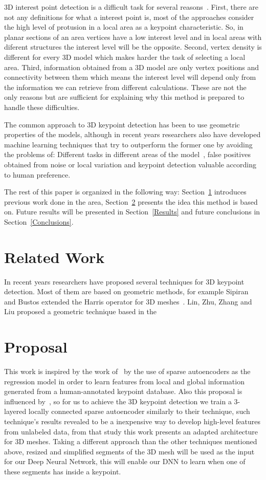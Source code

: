\documentclass{comjnl}
\begin{document}
3D interest point detection is a difficult task for several reasons~\cite{Discrim, harris3D}. 
First, there are not any definitions for what a interest point is, 
most of the approaches consider the high level of protusion in a local
area as a keypoint characteristic. So, in planar sections of an area
vertices have a low interest level and in local areas with diferent
structures the interest level will be the opposite. Second, vertex 
density is different for every 3D model which makes harder the task of
selecting a local area. Third, information obtained from a 3D model
are only vertex positions and connectivity between them which means
the interest level will depend only from the information we can
retrieve from different calculations. These are not the only reasons
but are sufficient for explaining why this method is prepared to
handle these difficulties. 

The common approach to 3D keypoint detection has been to use 
geometric properties of the models, although in recent years researchers
also have developed machine learning techniques that try to outperform the
former one by avoiding the problems of: Different tasks in different areas
of the model~\cite{DNN}, false positives obtained from noise or local
variation and keypoint detection valuable according to human preference. 

The rest of this paper is organized in the following way:
Section~\ref{RelatedWork} introduces previous work done in the area,
Section~\ref{Proposal} presents the idea this method is based on. Future
results will be presented in Section~\ref{Results} and future conclusions
in Section~\ref{Conclusions}.

\section{Related Work} \label{RelatedWork}
In recent years researchers have proposed several techniques for
3D keypoint detection. Most of them are based on geometric methods, for
example Sipiran and Bustos extended the Harris operator for 3D
meshes~\cite{harris3D}. Lin, Zhu, Zhang and Liu proposed a geometric
technique based in the 

\section{Proposal} \label{Proposal}
This work is inspired by the work of~\cite{DNN} by the use of
sparse autoencoders as the regression model in order to learn features
from local and global information generated from a human-annotated
keypoint database. Also this proposal is influenced by~\cite{UnsLearning},
so for us to achieve the 3D keypoint detection we train a 3-layered locally
connected sparse autoencoder similarly to their technique, such
technique's results revealed to be a inexpensive way to develop
high-level features from unlabeled data, from that study this work
presents an adapted architecture for 3D meshes. Taking a different approach
than the other techniques mentioned above, resized and simplified segments
of the 3D mesh will be used as the input for our Deep Neural Network,
this will enable our DNN to learn when one of these segments has inside
a keypoint.
\end{document}

